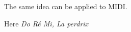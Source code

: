 \documentclass[preview]{standalone}
\begin{document}
\begin{center}
The same idea can be applied to MIDI.

    Here \em{Do Ré Mi, La perdrix}
\end{center}
\end{document}
